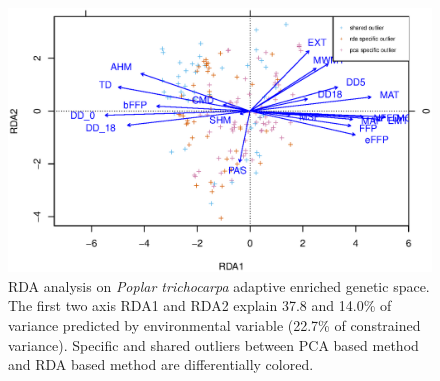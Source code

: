 \documentclass[12pt]{article}
\begin{document}
\begin{figure}[t]
\begin{center}
\includegraphics[height=0.6\textheight]{figures/poplar_rda.eps}
\end{center}
\caption{RDA analysis on \textit{Poplar trichocarpa} adaptive enriched genetic space. The first two axis RDA1 and RDA2 explain 37.8 and 14.0\% of variance predicted by environmental variable (22.7\% of constrained variance). Specific and shared outliers between PCA based method and RDA based method are differentially colored.}%
\label{fig:poplarrda}%
\end{figure}
\end{document}
